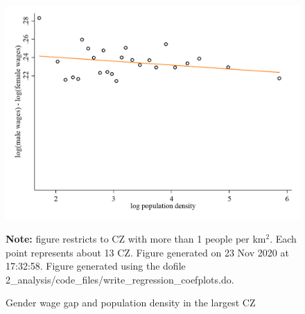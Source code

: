 \begin{figure}[!h]
\centering
\caption{Gender wage gap and population density in the largest CZ}
\includegraphics[width=1\textwidth]{../2_analysis/output/figures/l_czone_density_2020_big_CZ}
\par \begin{minipage}[h]{\textwidth}{\tiny\textbf{Note:} figure restricts to CZ with more than 1 people per km$^2$. Each point represents about 13 CZ. Figure generated on 23 Nov 2020 at 17:32:58. Figure generated using the dofile 2\_analysis/code\_files/write\_regression\_coefplots.do.}\end{minipage}
\end{figure}
